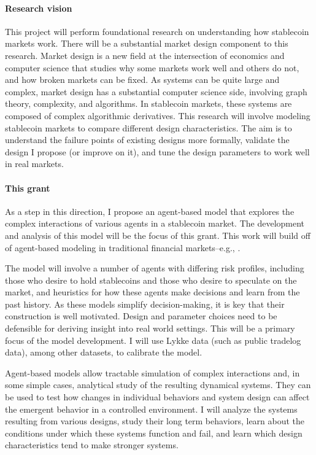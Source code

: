 \documentclass[10pt]{article}
\begin{document}
\paragraph{Research vision}
This project will perform foundational research on understanding how stablecoin markets work. There will be a substantial market design component to this research. Market design is a new field at the intersection of economics and computer science that studies why some markets work well and others do not, and how broken markets can be fixed. As systems can be quite large and complex, market design has a substantial computer science side, involving graph theory, complexity, and algorithms. In stablecoin markets, these systems are composed of complex algorithmic derivatives. This research will involve modeling stablecoin markets to compare different design characteristics. The aim is to understand the failure points of existing designs more formally, validate the design I propose (or improve on it), and tune the design parameters to work well in real markets.

\paragraph{This grant}
As a step in this direction, I propose an agent-based model that explores the complex interactions of various agents in a stablecoin market. The development and analysis of this model will be the focus of this grant. This work will build off of agent-based modeling in traditional financial markets--e.g., \citep{farmer15}.

The model will involve a number of agents with differing risk profiles, including those who desire to hold stablecoins and those who desire to speculate on the market, and heuristics for how these agents make decisions and learn from the past history. As these models simplify decision-making, it is key that their construction is well motivated. Design and parameter choices need to be defensible for deriving insight into real world settings. This will be a primary focus of the model development. I will use Lykke data (such as public tradelog data), among other datasets, to calibrate the model.

Agent-based models allow tractable simulation of complex interactions and, in some simple cases, analytical study of the resulting dynamical systems. They can be used to test how changes in individual behaviors and system design can affect the emergent behavior in a controlled environment. I will analyze the systems resulting from various designs, study their long term behaviors, learn about the conditions under which these systems function and fail, and learn which design characteristics tend to make stronger systems.
\end{document}
